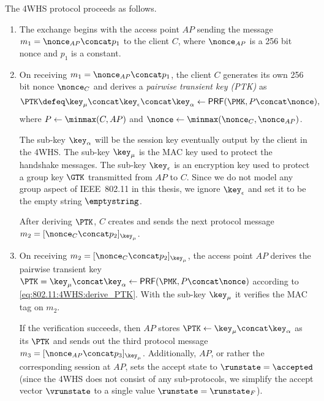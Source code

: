 The 4WHS protocol proceeds as follows.



\begin{enumerate}
	\item  The exchange begins with the access point $AP$ sending the message $m_1 = \nonce_{AP} \concat p_1$ to the client $C$,
	where $\nonce_{AP}$ is a 256 bit nonce and $p_1$ is a constant.
	
	\item On receiving $m_1 = \nonce_{AP} \concat p_1$, 
	the client $C$ generates its own 256 bit nonce $\nonce_C$
	and derives a  \emph{pairwise transient key (PTK)} as
	\begin{equation}\label{eq:802.11:4WHS:derive_PTK}
		\PTK \defeq \key_\mu \concat \key_\epsilon \concat \key_\alpha \gets \mathsf{PRF}(\PMK, P \concat \nonce) ,
	\end{equation}
	where 
	$P \gets \minmax(C, AP)$
	and
	$\nonce \gets  \minmax(\nonce_{C}, \nonce_{AP})$. 

	The sub-key $\key_\alpha$ will be the session key eventually output by the client in the 4WHS.
	The sub-key $\key_\mu$ is the MAC key used to protect the handshake messages.
	The sub-key $\key_\epsilon$	is an encryption key used to protect a group key $\GTK$ transmitted from $AP$ to $C$.
	Since we do not model any group aspect of IEEE~802.11 in this thesis,
	we ignore $\key_\epsilon$ and set it to be the empty string $\emptystring$.
	
	
	After deriving $\PTK$,
	$C$ creates and sends the next protocol message $m_2 = [\nonce_C \concat p_2]_{\key_\mu}$.
	
	\item On receiving $m_2 = [\nonce_C \concat p_2]_{\key_\mu}$,
	the access point $AP$ derives the pairwise transient key $\PTK = \key_\mu \concat \key_\alpha \gets \mathsf{PRF}(\PMK, P \concat \nonce)$ according to \cref{eq:802.11:4WHS:derive_PTK}.
	With the sub-key $\key_\mu$ it verifies the MAC tag on $m_2$.
	
	If the verification succeeds,
	then $AP$ stores $\PTK \gets \key_{\mu} \concat \key_\alpha$ as its $\PTK$ 
	and sends out the third protocol message $m_3 = [\nonce_{AP} \concat p_3]_{\key_\mu}$.
	Additionally,
	$AP$,
	or rather the corresponding session at $AP$,
	sets the accept state to $\runstate = \accepted$
	(since the 4WHS does not consist of any sub-protocols, we simplify the accept vector $\vrunstate$ to a single value $\runstate = \runstate_F$).
	

\end{enumerate}
